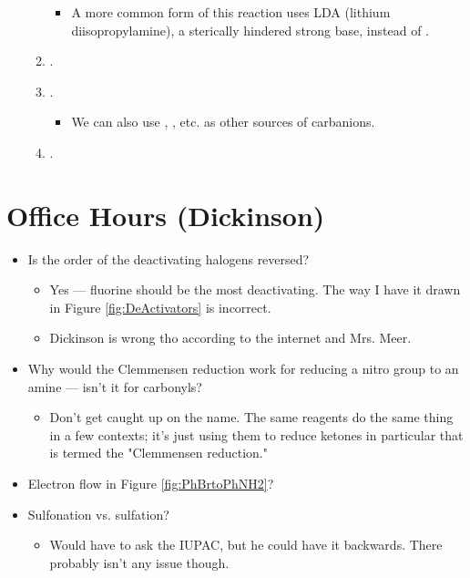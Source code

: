 \documentclass[../notes.tex]{subfiles}
\begin{document}
\begin{itemize}
\begin{enumerate}
        \begin{itemize}
            \item A more common form of this reaction uses LDA (lithium diisopropylamine), a sterically hindered strong base, instead of .
        \end{itemize}
        \item {}.
        \item {}.
        \begin{itemize}
            \item We can also use , , etc. as other sources of carbanions.
        \end{itemize}
        \item {}.
    \end{enumerate}
\end{itemize}



\section{Office Hours (Dickinson)}
\begin{itemize}
    \item Is the order of the deactivating halogens reversed?
    \begin{itemize}
        \item Yes --- fluorine should be the most deactivating. The way I have it drawn in Figure \ref{fig:DeActivators} is incorrect.
        \item Dickinson is wrong tho according to the internet and Mrs. Meer.
    \end{itemize}
    \item Why would the Clemmensen reduction work for reducing a nitro group to an amine --- isn't it for carbonyls?
    \begin{itemize}
        \item Don't get caught up on the name. The same reagents do the same thing in a few contexts; it's just using them to reduce ketones in particular that is termed the "Clemmensen reduction."
    \end{itemize}
    \item Electron flow in Figure \ref{fig:PhBrtoPhNH2}?
    \item Sulfonation vs. sulfation?
    \begin{itemize}
        \item Would have to ask the IUPAC, but he could have it backwards. There probably isn't any issue though.
    \end{itemize}
\end{itemize}
\end{document}
